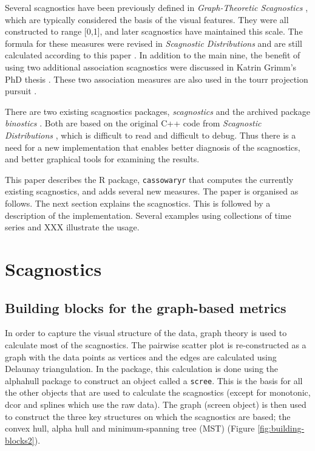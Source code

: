 Several scagnostics have been previously defined in
\emph{Graph-Theoretic Scagnostics} \citep{scag}, which are typically
considered the basis of the visual features. They were all constructed
to range {[}0,1{]}, and later scagnostics have maintained this scale.
The formula for these measures were revised in \emph{Scagnostic
Distributions} and are still calculated according to this paper
\citep{scagdist}. In addition to the main nine, the benefit of using two
additional association scagnostics were discussed in Katrin Grimm's PhD
thesis \citep{Grimm}. These two association measures are also used in
the tourr projection pursuit \citep{tourrpp}.

There are two existing scagnostics packages, \emph{scagnostics}
\citep{scagdist} and the archived package \emph{binostics}
\citep{binostics}. Both are based on the original C++ code from
\emph{Scagnostic Distributions} \citep{scagdist}, which is difficult to
read and difficult to debug. Thus there is a need for a new
implementation that enables better diagnosis of the scagnostics, and
better graphical tools for examining the results.

This paper describes the R package, \texttt{cassowaryr} that computes
the currently existing scagnostics, and adds several new measures. The
paper is organised as follows. The next section explains the
scagnostics. This is followed by a description of the implementation.
Several examples using collections of time series and XXX illustrate the
usage.

\hypertarget{scagnostics}{%
\section{Scagnostics}\label{scagnostics}}

\hypertarget{building-blocks-for-the-graph-based-metrics}{%
\subsection{Building blocks for the graph-based
metrics}\label{building-blocks-for-the-graph-based-metrics}}

In order to capture the visual structure of the data, graph theory is
used to calculate most of the scagnostics. The pairwise scatter plot is
re-constructed as a graph with the data points as vertices and the edges
are calculated using Delaunay triangulation. In the package, this
calculation is done using the alphahull package \citep{alphahull} to
construct an object called a \texttt{scree}. This is the basis for all
the other objects that are used to calculate the scagnostics (except for
monotonic, dcor and splines which use the raw data). The graph (screen
object) is then used to construct the three key structures on which the
scagnostics are based; the convex hull, alpha hull and minimum-spanning
tree (MST) (Figure \ref{fig:building-blocks2}).

